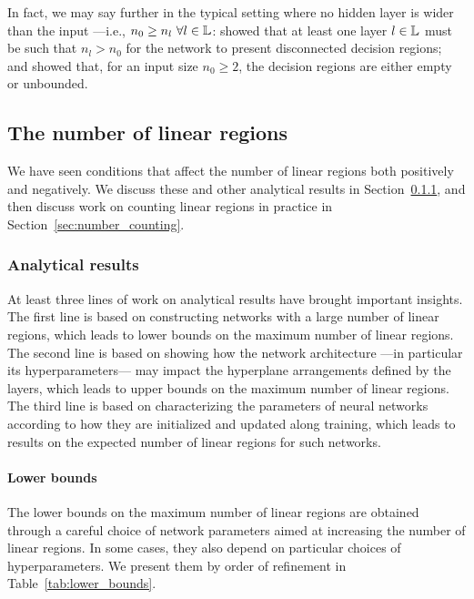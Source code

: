 In fact, we may say further in the typical setting where no hidden layer is wider than the input ---i.e., $n_0 \geq n_l ~ \forall l \in {\mathbb{L}}$: 
\cite{pmlr-v80-nguyen18b} showed that at least one layer $l \in {\mathbb{L}}$ must be such that $n_l > n_0$ for the network to present disconnected decision regions; and 
\cite{grigsby2022topology} showed that, for an input size $n_0 \geq 2$, the decision regions are either empty or unbounded. 


\subsection{The number of linear regions}\label{sec:number}


We have seen conditions that affect the number of linear regions both positively and negatively. 
We discuss these and other analytical results in Section~\ref{sec:number_analytical}, and then discuss work on counting linear regions in practice in Section~\ref{sec:number_counting}.

\subsubsection{Analytical results}\label{sec:number_analytical}

At least three lines of work on analytical results have brought important insights. 
The first line is based on constructing networks with a large number of linear regions, 
which leads to lower bounds on the maximum number of linear regions. 
The second line is based on showing how the network architecture ---in particular its hyperparameters--- may impact the hyperplane arrangements defined by the layers, 
which leads to upper bounds on the maximum number of linear regions. 
The third line is based on characterizing the parameters of neural networks according to how they are initialized and updated along training, 
which leads to results on the expected number of linear regions for such networks. 

\paragraph{Lower bounds}

The lower bounds on the maximum number of linear regions are obtained through a careful choice of network parameters aimed at increasing the number of linear regions. 
In some cases, they also depend on particular choices of hyperparameters. 
We present them by order of refinement in Table~\ref{tab:lower_bounds}.

